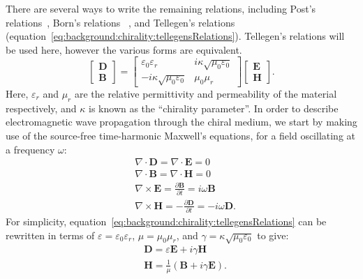 There are several ways to write the remaining relations, including Post's relations~\cite{Capolino2009}, Born's relations~\cite{Lekner1999, Barnett2016} , and Tellegen's relations~\cite{Capolino2009,kong1986,lindell1994} (equation~\ref{eq:background:chirality:tellegensRelations}). Tellegen's relations will be used here, however the various forms are equivalent.
\begin{equation}\label{eq:background:chirality:tellegensRelations}
    \begin{bmatrix}
        \mathbf{D} \\
        \mathbf{B}
    \end{bmatrix}
    =
    \begin{bmatrix}
        \varepsilon_0 \varepsilon_r & i \kappa \sqrt{\mu_0 \varepsilon_0} \\
        -i \kappa \sqrt{\mu_0 \varepsilon_0} & \mu_0 \mu_r
    \end{bmatrix}
    \begin{bmatrix}
        \mathbf{E} \\
        \mathbf{H}
    \end{bmatrix}.
\end{equation}
Here, ${{\varepsilon }_{r}}$ and $\mu_r$ are the relative permittivity and permeability of the material respectively, and $\kappa$ is known as the ``chirality parameter''. In order to describe electromagnetic wave propagation through the chiral medium, we start by making use of the source-free time-harmonic Maxwell's equations, for a field oscillating at a frequency $\omega$:
\begin{align}
    & \nabla \cdot \mathbf{D} = \nabla \cdot \mathbf{E} = 0 \label{eq:background:chirality:maxwellD}\\
    & \nabla \cdot \mathbf{B} = \nabla \cdot \mathbf{H} = 0 \label{eq:background:chirality:maxwellB}\\
    & \nabla \times \mathbf{E} = \frac{\partial \mathbf{B}}{\partial t} = i \omega \mathbf{B} \label{eq:background:chirality:maxwellE}\\
    & \nabla \times \mathbf{H} =  -\frac{\partial \mathbf{D}}{\partial t} = -i \omega \mathbf{D} \label{eq:background:chirality:maxwellH}.
\end{align}
For simplicity, equation~\ref{eq:background:chirality:tellegensRelations} can be rewritten in terms of $\varepsilon = \varepsilon_0 \varepsilon_r$, $\mu = \mu_0 \mu_r$, and $\gamma = \kappa \sqrt{\mu_0 \varepsilon_0}$ to give:
\begin{align}
    & \mathbf{D} = \varepsilon \mathbf{E} + i \gamma \mathbf{H} \label{eq:background:chirality:tellegensSimplifiedD} \\
    & \mathbf{H} = \frac{1}{\mu}( \mathbf{B} + i \gamma \mathbf{E} ) \label{eq:background:chirality:tellegensSimplifiedH}.
\end{align}
